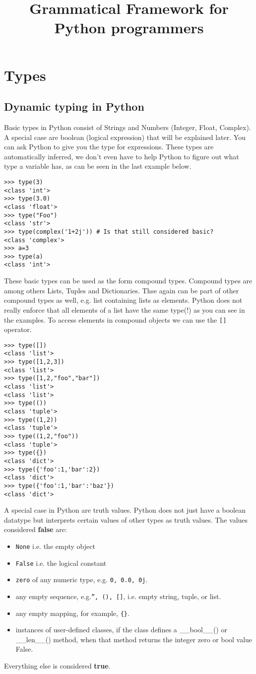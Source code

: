 \documentclass{scrartcl}
\title{Grammatical Framework for Python programmers}
\begin{document}
\maketitle
\section{Types}
\subsection{Dynamic typing in Python}

Basic types in Python consist of Strings and Numbers (Integer, Float, Complex). A special case are boolean (logical expression) that will be explained later.
You can ask Python to give you the type for expressions. These types are automatically inferred, we don't even have to help Python to figure out what type
a variable has, as can be seen in the last example below.

\begin{verbatim}
>>> type(3)
<class 'int'>
>>> type(3.0)
<class 'float'>
>>> type("Foo")
<class 'str'>
>>> type(complex('1+2j')) # Is that still considered basic?
<class 'complex'>
>>> a=3
>>> type(a)
<class 'int'>
\end{verbatim}

These basic types can be used as the form compound types. Compound types are among others Lists, Tuples and Dictionaries.
Thse again can be part of other compound types as well, e.g. list containing lists as elements. Python does not really enforce
that all elements of a list have the same type(!) as you can see in the examples. To access elements in compound objects we
can use the \texttt{[]} operator.

\begin{verbatim}
>>> type([])
<class 'list'>
>>> type([1,2,3])
<class 'list'>
>>> type([1,2,"foo","bar"])
<class 'list'>
<class 'list'>
>>> type(())
<class 'tuple'>
>>> type((1,2))
<class 'tuple'>
>>> type((1,2,"foo"))
<class 'tuple'>
>>> type({})
<class 'dict'>
>>> type({'foo':1,'bar':2})
<class 'dict'>
>>> type({'foo':1,'bar':'baz'})
<class 'dict'>
\end{verbatim}

A special case in Python are truth values. Python does not just have a boolean datatype but interprets certain values of other types as truth values.
The values considered \textbf{false} are: 
\begin{itemize}
\item \texttt{None} i.e. the empty object
\item \texttt{False} i.e. the logical constant
\item \texttt{zero} of any numeric type, e.g. \texttt{0, 0.0, 0j}.
\item any empty sequence, e.g.\texttt{'', (), []}, i.e. empty string, tuple, or list.
\item any empty mapping, for example, \texttt{\{\}}.
\item instances of user-defined classes, if the class defines a \_\_bool\_\_() or \_\_len\_\_() method, when that method returns the integer zero or bool value False.
\end{itemize}
Everything else is considered \textbf{true}.
\end{document}
